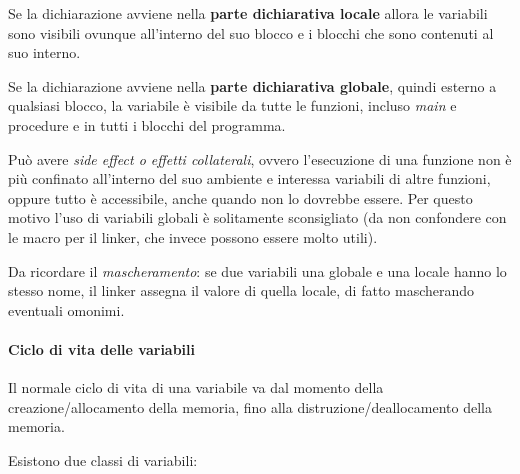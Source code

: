 \documentclass[
]{article}
\begin{document}
Se la dichiarazione avviene nella \textbf{parte dichiarativa locale}
allora le variabili sono visibili ovunque all'interno del suo blocco e i
blocchi che sono contenuti al suo interno.

Se la dichiarazione avviene nella \textbf{parte dichiarativa globale},
quindi esterno a qualsiasi blocco, la variabile è visibile da tutte le
funzioni, incluso \emph{main} e procedure e in tutti i blocchi del
programma.

Può avere \emph{side effect o effetti collaterali}, ovvero l'esecuzione
di una funzione non è più confinato all'interno del suo ambiente e
interessa variabili di altre funzioni, oppure tutto è accessibile, anche
quando non lo dovrebbe essere. Per questo motivo l'uso di variabili
globali è solitamente sconsigliato (da non confondere con le macro per
il linker, che invece possono essere molto utili).

Da ricordare il \emph{mascheramento}: se due variabili una globale e una
locale hanno lo stesso nome, il linker assegna il valore di quella
locale, di fatto mascherando eventuali omonimi.

\hypertarget{header-n887}{%
\paragraph{Ciclo di vita delle variabili}\label{header-n887}}

Il normale ciclo di vita di una variabile va dal momento della
creazione/allocamento della memoria, fino alla distruzione/deallocamento
della memoria.

Esistono due classi di variabili:
\end{document}
